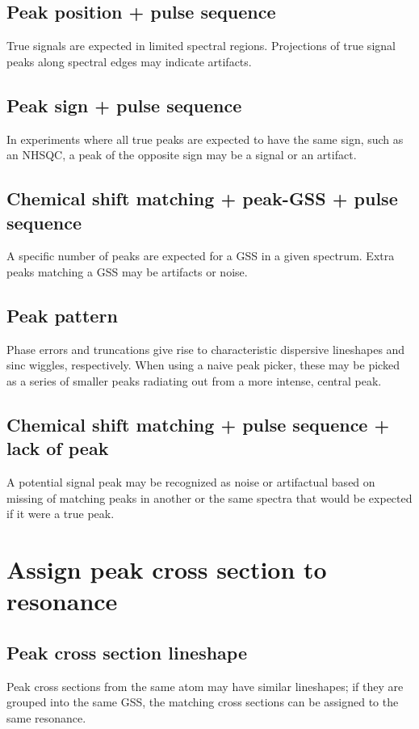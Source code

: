 \subsection*{Peak position + pulse sequence}
True signals are expected in limited spectral regions.
Projections of true signal peaks along spectral edges may indicate artifacts.

\subsection*{Peak sign + pulse sequence}
In experiments where all true peaks are expected to have the same sign, such 
as an NHSQC, a peak of the opposite sign may be a signal or an artifact.

\subsection*{Chemical shift matching + peak-GSS + pulse sequence}
A specific number of peaks are expected for a GSS in a given spectrum.
Extra peaks matching a GSS may be artifacts or noise.

\subsection*{Peak pattern}
Phase errors and truncations give rise to characteristic dispersive lineshapes
and sinc wiggles, respectively.  When using a naive peak picker, these may
be picked as a series of smaller peaks radiating out from a more intense,
central peak.

\subsection*{Chemical shift matching + pulse sequence + lack of peak}
A potential signal peak may be recognized as noise or artifactual based on
missing of matching peaks in another or the same spectra that would be 
expected if it were a true peak.



\section*{Assign peak cross section to resonance}

\subsection*{Peak cross section lineshape}
Peak cross sections from the same atom may have similar lineshapes;
if they are grouped into the same GSS, the matching cross sections can be
assigned to the same resonance.

